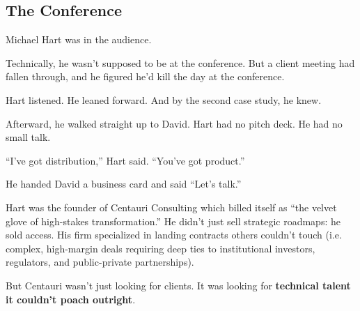 \subsection{The Conference}

Michael Hart was in the audience.

Technically, he wasn’t supposed to be at the conference. But a client meeting had fallen through, and he figured he’d kill 
the day at the conference. 

Hart listened.  He leaned forward. And by the second case study, he knew.

Afterward, he walked straight up to David. Hart had no pitch deck. He had no small talk.

“I’ve got distribution,” Hart said. “You’ve got product.”

He handed David a business card and said “Let’s talk.”

Hart was the founder of Centauri Consulting which billed itself as “the velvet glove of high-stakes transformation.” 
He didn’t just sell strategic roadmaps: he sold access. His firm specialized in landing contracts others couldn’t 
touch (i.e. complex, high-margin deals requiring deep ties to institutional investors, regulators, and 
public-private partnerships).

But Centauri wasn’t just looking for clients. It was looking for \textbf{technical talent it couldn’t poach outright}.

\medskip


